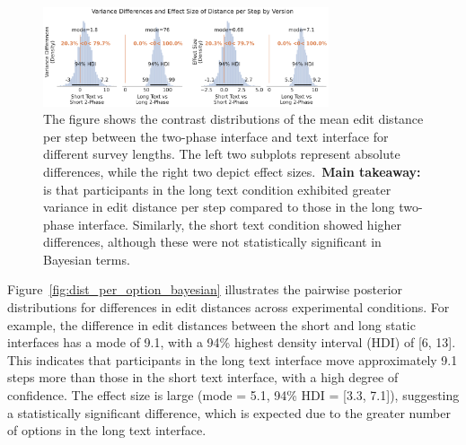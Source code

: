 \begin{figure}[ht!]
    \centering
    \includegraphics[width=0.75\textwidth]{content/image/distance/distance_diff_per_step_effect_size_by_version.pdf}
    \caption{The figure shows the contrast distributions of the mean edit distance per step between the two-phase interface and text interface for different survey lengths. The left two subplots represent absolute differences, while the right two depict effect sizes.~\textbf{Main takeaway:} is that participants in the long text condition exhibited greater variance in edit distance per step compared to those in the long two-phase interface. Similarly, the short text condition showed higher differences, although these were not statistically significant in Bayesian terms.}
    \label{fig:step-over-distance_bayesian}
\end{figure}

Figure~\ref{fig:dist_per_option_bayesian} illustrates the pairwise posterior distributions for differences in edit distances across experimental conditions. For example, the difference in edit distances between the short and long static interfaces has a mode of 9.1, with a 94\% highest density interval (HDI) of [6, 13]. This indicates that participants in the long text interface move approximately 9.1 steps more than those in the short text interface, with a high degree of confidence. The effect size is large (mode = 5.1, 94\% HDI = [3.3, 7.1]), suggesting a statistically significant difference, which is expected due to the greater number of options in the long text interface.

